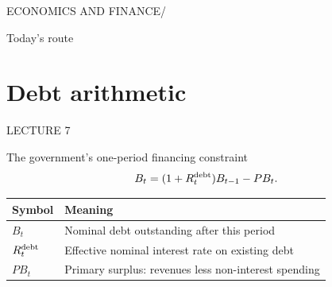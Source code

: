 \documentclass[12pt,aspectratio=169]{beamer}
\begin{document}

\begin{frame}[plain]
{\color{Teal}\large ECONOMICS AND FINANCE\quad /}\par\vspace{9mm}{\Huge\bfseries Public debt and macro trades}\par\vspace{7mm}{\Large How do fiscal promises, monetary policy and market prices interact?}
\end{frame}


\begin{frame}{Today’s route}
\end{frame}

\section[Debt arithmetic]{Debt arithmetic}
\begin{frame}[plain]
{\color{Gold}\large LECTURE 7}\par\vspace{9mm}{\Huge\bfseries Debt arithmetic}\par\vspace{7mm}{\Large What makes the debt ratio rise or fall?}
\end{frame}


\begin{frame}{The government’s one-period financing constraint}
\[B_t=(1+R_t^{\rm debt})B_{t-1}-PB_t.\]\begin{center}\begin{tabular}{@{}ll@{}}\toprule \textbf{Symbol} & \textbf{Meaning}\\\midrule $B_t$ & Nominal debt outstanding after this period\\[2mm]
$R_t^{\rm debt}$ & Effective nominal interest rate on existing debt\\[2mm]
$PB_t$ & Primary surplus: revenues less non-interest spending\\\bottomrule\end{tabular}\end{center}
\end{frame}
\end{document}
